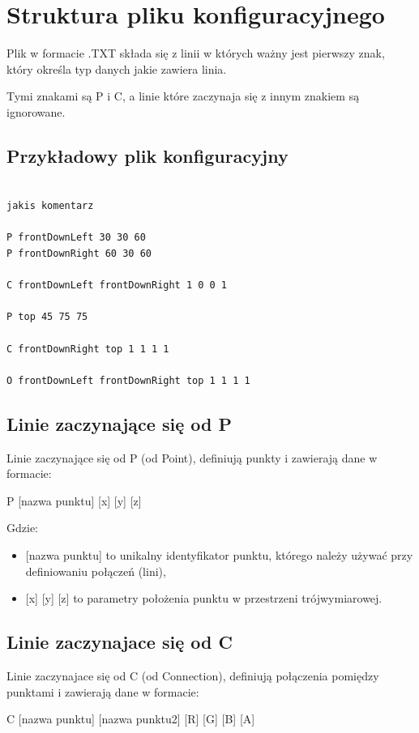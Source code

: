 \documentclass[12pt]{article}
\begin{document}
\newpage
\section{Struktura pliku konfiguracyjnego}
Plik w formacie .TXT składa się z linii w których ważny jest pierwszy znak, który określa typ danych jakie zawiera linia.

Tymi znakami są P i C, a linie które zaczynaja się z innym znakiem są ignorowane.

\subsection{Przykładowy plik konfiguracyjny}
\begin{lstlisting}[frame=single]  % Start your code-block

jakis komentarz

P frontDownLeft 30 30 60
P frontDownRight 60 30 60

C frontDownLeft frontDownRight 1 0 0 1

P top 45 75 75

C frontDownRight top 1 1 1 1

O frontDownLeft frontDownRight top 1 1 1 1
\end{lstlisting}


\subsection{Linie zaczynające się od P}
Linie zaczynające się od P (od Point), definiują punkty i zawierają dane w formacie:
\begin{center}
    P [nazwa punktu] [x] [y] [z]
\end{center}

Gdzie: 
\begin{itemize}
    \item {[nazwa punktu]} to unikalny identyfikator punktu, którego należy używać przy definiowaniu połączeń (lini),
    \item {[x] [y] [z]} to parametry położenia punktu w przestrzeni trójwymiarowej.
\end{itemize}

\subsection{Linie zaczynajace się od C}
Linie zaczynajace się od C (od Connection), definiują połączenia pomiędzy punktami i zawierają dane w formacie:
\begin{center}
    C [nazwa punktu] [nazwa punktu2] [R] [G] [B] [A]
\end{center}
\end{document}
